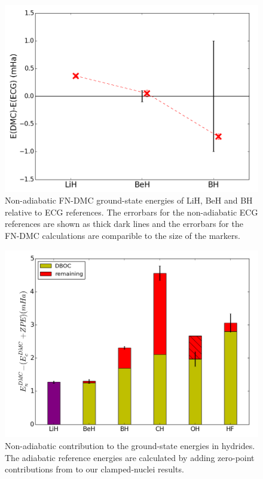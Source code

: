 \documentclass[pra,superscriptaddress,groupedaddress,twocolumn]{revtex4}
\begin{document}
\begin{figure}[h]
\centering
\includegraphics[scale=.37]{Figures/dia-ECG}
\caption{Non-adiabatic FN-DMC ground-state energies of LiH, BeH and BH relative to ECG references. The errorbars for the non-adiabatic ECG references are shown as thick dark lines and the errorbars for the FN-DMC calculations are comparible to the size of the markers. \label{fig:dia-ECG}}
\end{figure}

\begin{figure}[h]
\includegraphics[scale=.37]{Figures/dia-nad-ad}
\caption{Non-adiabatic contribution to the ground-state energies in hydrides. The adiabatic reference energies are calculated by adding zero-point contributions from \cite{Feller_Corrections} to our clamped-nuclei results. \label{fig:dia-nad-ad}}
\end{figure}
\end{document}
